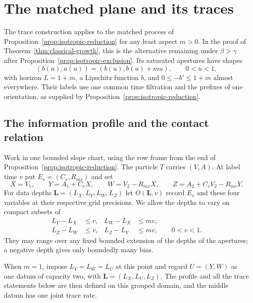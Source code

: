 \section{The matched plane and its traces}
\label{sec:characteristic-plane}

The trace construction applies to the matched process of
Proposition~\ref{prop:isotropic-reduction} for any least aspect $m>0$.
In the proof of Theorem~\ref{thm:classical-growth}, this is the
alternative remaining under $\beta>\gamma$ after
Proposition~\ref{prop:isotropic-exclusion}.  Its saturated apertures have shapes
\[
 (b(u),a(u))=(b(u),b(u)+mu),\qquad 0<u<1,
\]
with horizon $L=1+m$, a Lipschitz function $b$, and
$0\le-b'\le1+m$ almost everywhere.  Their labels use one common time
filtration and the prefixes of one orientation, as supplied by
Proposition~\ref{prop:isotropic-reduction}.

\subsection{The information profile and the contact relation}

Work in one bounded slope chart, using the row frame from the end of
Proposition~\ref{prop:isotropic-reduction}.  The particle $T$ carries
$(V,A)$.  At label time $v$ put $E_v=(C_v,R_{mv})$ and set
\begin{equation}\label{eq:trace-variables}
 X=V_1,\qquad Y=A_1+C_vX,\qquad
 W=V_2-R_{mv}X,\qquad
 Z=A_2+C_vV_2-R_{mv}Y.
\end{equation}
For data depths $\mathbf L=(L_X,L_Y,L_W,L_Z)$ let $O(\mathbf L,v)$ record $E_v$ and
these four variables at their respective grid precisions.  We allow
the depths to vary on compact subsets of
\begin{equation}\label{eq:trace-domain}
 \begin{aligned}
 L_Y-L_X&\le v,& L_W-L_X&\le mv,\\
 L_Z-L_W&\le v,& L_Z-L_Y&\le mv,
 \qquad 0<v<1.
 \end{aligned}
\end{equation}
They may range over any fixed bounded extension of the depths of the
apertures; a negative depth gives only boundedly many bins.

When $m=1$, impose $L_Y=L_W=L_U$ at this point and regard
$U=(Y,W)$ as one datum of capacity two, with
$\mathbf L=(L_X,L_U,L_Z)$.  The profile and all the trace
statements below are then defined on this grouped domain, and the middle
datum has one joint trace rate.

